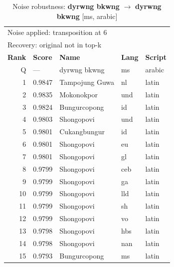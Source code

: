 \begin{table}[htbp]
\centering
\small
\caption{Noise robustness: \textbf{dyrwng bkwng} $\rightarrow$ \textbf{dyrwng bkwng} [ms, arabic]}
\label{tab:noise-33}
\begin{tabular}{rllll}
\toprule
\multicolumn{5}{l}{\small Noise applied: transposition at 6} \\
\multicolumn{5}{l}{\small Recovery: original not in top-k} \\
\midrule
\textbf{Rank} & \textbf{Score} & \textbf{Name} & \textbf{Lang} & \textbf{Script} \\
\midrule
\rowcolor{gray!20} Q & --- & dyrwng bkwng & ms & arabic \\
\midrule
1 & 0.9847 & Tampojung Guwa & nl & latin \\
2 & 0.9835 & Mokonokpor & und & latin \\
3 & 0.9824 & Bungurcopong & id & latin \\
4 & 0.9803 & Shongopovi & und & latin \\
5 & 0.9801 & Cukangbungur & id & latin \\
6 & 0.9801 & Shongopovi & eu & latin \\
7 & 0.9801 & Shongopovi & gl & latin \\
8 & 0.9799 & Shongopovi & ceb & latin \\
9 & 0.9799 & Shongopovi & ga & latin \\
10 & 0.9799 & Shongopovi & lld & latin \\
11 & 0.9799 & Shongopovi & sh & latin \\
12 & 0.9799 & Shongopovi & vo & latin \\
13 & 0.9798 & Shongopovi & hbs & latin \\
14 & 0.9798 & Shongopovi & nan & latin \\
15 & 0.9793 & Bungurcopong & ms & latin \\
\bottomrule
\end{tabular}
\end{table}

